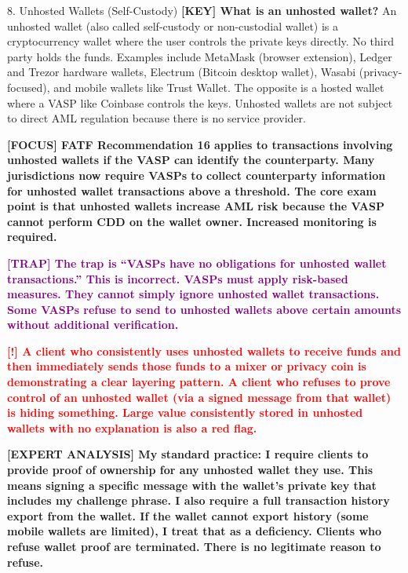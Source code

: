 \documentclass[11pt,a4paper]{beamer}
\newcommand{\redflag}[1]{\textcolor{red}{\textbf{[!] #1}}}
\newcommand{\examfocus}[1]{\textcolor{orange!80!black}{\textbf{[FOCUS] #1}}}
\newcommand{\trap}[1]{\textcolor{purple}{\textbf{[TRAP] #1}}}
\newcommand{\keyterm}[1]{\textcolor{red!80!black}{\textbf{[KEY] #1}}}
\newcommand{\expert}[1]{\textcolor{blue!70!black}{\textbf{[EXPERT ANALYSIS] #1}}}
\begin{document}
	\begin{frame}{8. Unhosted Wallets (Self-Custody)}
		\tiny
		\keyterm{What is an unhosted wallet?} An unhosted wallet (also called self-custody or non-custodial wallet) is a cryptocurrency wallet where the user controls the private keys directly. No third party holds the funds. Examples include MetaMask (browser extension), Ledger and Trezor hardware wallets, Electrum (Bitcoin desktop wallet), Wasabi (privacy-focused), and mobile wallets like Trust Wallet. The opposite is a hosted wallet where a VASP like Coinbase controls the keys. Unhosted wallets are not subject to direct AML regulation because there is no service provider.
		
		\vspace{0.1cm}
		\examfocus{FATF Recommendation 16 applies to transactions involving unhosted wallets if the VASP can identify the counterparty. Many jurisdictions now require VASPs to collect counterparty information for unhosted wallet transactions above a threshold. The core exam point is that unhosted wallets increase AML risk because the VASP cannot perform CDD on the wallet owner. Increased monitoring is required.}
		
		\vspace{0.1cm}
		\trap{The trap is “VASPs have no obligations for unhosted wallet transactions.” This is incorrect. VASPs must apply risk-based measures. They cannot simply ignore unhosted wallet transactions. Some VASPs refuse to send to unhosted wallets above certain amounts without additional verification.}
		
		\vspace{0.1cm}
		\redflag{A client who consistently uses unhosted wallets to receive funds and then immediately sends those funds to a mixer or privacy coin is demonstrating a clear layering pattern. A client who refuses to prove control of an unhosted wallet (via a signed message from that wallet) is hiding something. Large value consistently stored in unhosted wallets with no explanation is also a red flag.}
		
		\vspace{0.1cm}
		\expert{My standard practice: I require clients to provide proof of ownership for any unhosted wallet they use. This means signing a specific message with the wallet's private key that includes my challenge phrase. I also require a full transaction history export from the wallet. If the wallet cannot export history (some mobile wallets are limited), I treat that as a deficiency. Clients who refuse wallet proof are terminated. There is no legitimate reason to refuse.}
	\end{frame}
	
\end{document}
